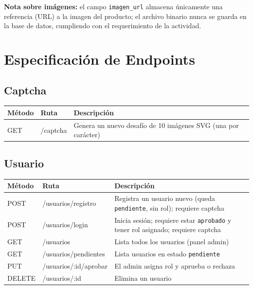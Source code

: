 \documentclass[11pt,a4paper]{article}
\begin{document}
\textbf{Nota sobre imágenes:} el campo \texttt{imagen\_url} almacena únicamente una referencia (URL) a la imagen del producto; el archivo binario nunca se guarda en la base de datos, cumpliendo con el requerimiento de la actividad.
 
\section{Especificación de Endpoints}
 
\subsection{Captcha}
\begin{longtable}{p{1.5cm}p{3cm}p{7cm}}
\toprule
\textbf{Método} & \textbf{Ruta} & \textbf{Descripción} \\
\midrule
\endhead
GET & /captcha & Genera un nuevo desafío de 10 imágenes SVG (una por carácter) \\
\bottomrule
\end{longtable}
 
\subsection{Usuario}
\begin{longtable}{p{1.5cm}p{4cm}p{7cm}}
\toprule
\textbf{Método} & \textbf{Ruta} & \textbf{Descripción} \\
\midrule
\endhead
POST & /usuarios/registro & Registra un usuario nuevo (queda \texttt{pendiente}, sin rol); requiere captcha \\
POST & /usuarios/login & Inicia sesión; requiere estar \texttt{aprobado} y tener rol asignado; requiere captcha \\
GET & /usuarios & Lista todos los usuarios (panel admin) \\
GET & /usuarios/pendientes & Lista usuarios en estado \texttt{pendiente} \\
PUT & /usuarios/:id/aprobar & El admin asigna rol y aprueba o rechaza \\
DELETE & /usuarios/:id & Elimina un usuario \\
\bottomrule
\end{longtable}
 
\end{document}
